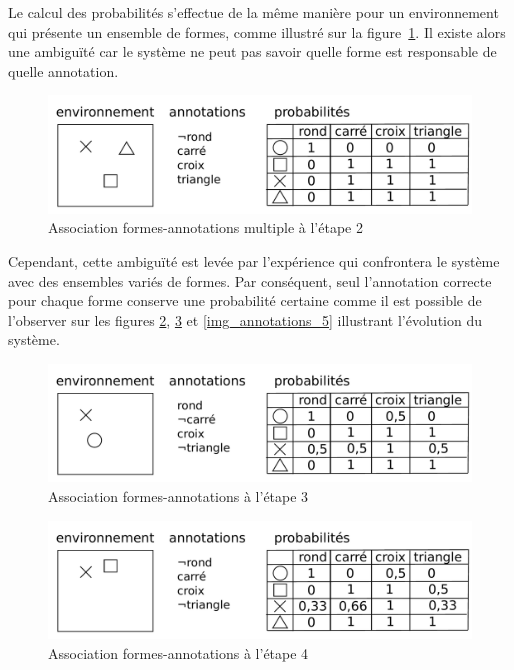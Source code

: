 Le calcul des probabilités s'effectue de la même manière pour un environnement qui présente un ensemble de formes, comme illustré sur la figure~\ref{img_annotations_2}. Il existe alors une ambiguïté car le système ne peut pas savoir quelle forme est responsable de quelle annotation.  

\begin{figure}[H] 
\includegraphics[width=\textwidth]{files/raisonneur/annotations_2} 
\caption{Association formes-annotations multiple à l'étape 2} 
\label{img_annotations_2}
\end{figure}

Cependant, cette ambiguïté est levée par l'expérience qui confrontera le système avec des ensembles variés de formes. Par conséquent, seul l'annotation correcte pour chaque forme conserve une probabilité certaine comme il est possible de l'observer sur les figures \ref{img_annotations_3}, \ref{img_annotations_4} et \ref{img_annotations_5} illustrant l'évolution du système. 

\begin{figure}[H] 
\includegraphics[width=\textwidth]{files/raisonneur/annotations_3} 
\caption{Association formes-annotations à l'étape 3} 
\label{img_annotations_3}
\end{figure}

\begin{figure}[H] 
\includegraphics[width=\textwidth]{files/raisonneur/annotations_4} 
\caption{Association formes-annotations à l'étape 4} 
\label{img_annotations_4}
\end{figure}

